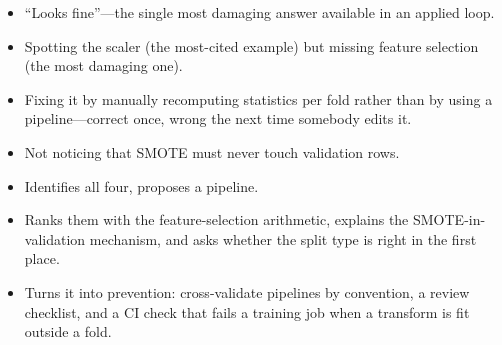 \begin{interviewq}
\redflags
\begin{itemize}
    \item ``Looks fine''---the single most damaging answer available in an applied loop.
    \item Spotting the scaler (the most-cited example) but missing feature selection (the most damaging one).
    \item Fixing it by manually recomputing statistics per fold rather than by using a pipeline---correct once, wrong the next time somebody edits it.
    \item Not noticing that SMOTE must never touch validation rows.
\end{itemize}


\goodgreat
\begin{itemize}
    \item {} Identifies all four, proposes a pipeline.
    \item {} Ranks them with the feature-selection arithmetic, explains the SMOTE-in-validation mechanism, and asks whether the split type is right in the first place.
    \item {} Turns it into prevention: cross-validate pipelines by convention, a review checklist, and a CI check that fails a training job when a transform is fit outside a fold.
\end{itemize}

\end{interviewq}


